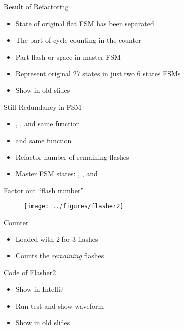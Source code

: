 \begin{frame}[fragile]{Result of Refactoring}
\begin{itemize}
\item State of original flat FSM has been separated
\item The part of cycle counting in the counter
\item Part flash or space in master FSM
\item Represent original 27 states in just two 6 states FSMs
\item Show in old slides
\end{itemize}
\end{frame}


\begin{frame}[fragile]{Still Redundancy in FSM}
\begin{itemize}
\item {}, , and  same function
\item {} and  same function
\item Refactor number of remaining flashes
\item Master FSM states: , ,
and 
\end{itemize}
\end{frame}

\begin{frame}[fragile]{Factor out ``flash number''}
\begin{figure}
  \texttt{[image: ../figures/flasher2]}
\end{figure}
\end{frame}

\begin{frame}[fragile]{Counter}
\begin{itemize}
\item Loaded with 2 for 3 flashes
\item Counts the \emph{remaining} flashes
\end{itemize}
\end{frame}

\begin{frame}[fragile]{Code of Flasher2}
\begin{itemize}
\item Show in IntelliJ
\item Run test and show waveform
\item Show in old slides
\end{itemize}
\end{frame}




